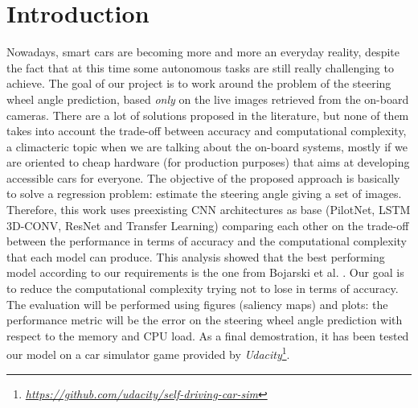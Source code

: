\documentclass[10pt,twocolumn,letterpaper]{article}
\begin{document}
\section{Introduction}
Nowadays, smart cars are becoming more and more an everyday reality, despite the fact that at this time some autonomous tasks are still really challenging to achieve. The goal of our project is to work around the problem of the steering wheel angle prediction, based \textit{only} on the live images retrieved from the on-board cameras. There are a lot of solutions proposed in the literature, but none of them takes into account the trade-off between accuracy and computational complexity, a climacteric topic when we are talking about the on-board systems, mostly if we are oriented to cheap hardware (for production purposes) that aims at developing accessible cars for everyone. The objective of the proposed approach is basically to solve a regression problem: estimate the steering angle giving a set of images. Therefore, this work uses preexisting CNN architectures as base (PilotNet, LSTM 3D-CONV, ResNet and Transfer Learning) comparing each other on the trade-off between the performance in terms of accuracy and the computational complexity that each model can produce. This analysis showed that the best performing model according to our requirements is the one from Bojarski et al. \cite{Alpher03}. Our goal is to reduce the computational complexity trying not to lose in terms of accuracy. The evaluation will be performed using figures (saliency maps) and plots: the performance metric will be the error on the steering wheel angle prediction with respect to the memory and CPU load. As a final demostration, it has been tested our model on a car simulator game provided by \textit{Udacity}\footnote{\href{https://github.com/udacity/self-driving-car-sim}{\textit{https://github.com/udacity/self-driving-car-sim}}}.

\end{document}
